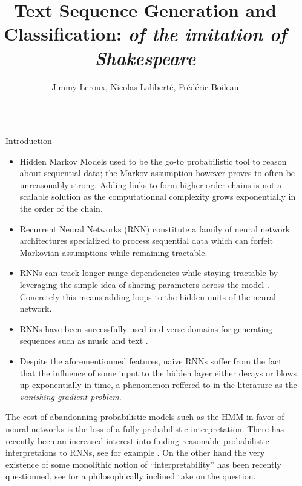 \documentclass[final]{beamer}
\title{Text Sequence Generation and Classification: \textit{of the imitation of
Shakespeare}}
\author{Jimmy Leroux, Nicolas Laliberté, Frédéric Boileau}
\institute[]{Départment d'Informatique et de Recherche Opérationnelle -
Université de Montréal}
\newlength{\sepwidth}
\newlength{\colwidth}
\newcommand{\separatorcolumn}{\begin{column}{\sepwidth}\end{column}}
\begin{document}
\begin{frame}[t]
\begin{columns}[t]
\separatorcolumn

\begin{column}{\colwidth}

\begin{block}{Introduction}
\begin{itemize}
\item Hidden Markov Models used to be the go-to probabilistic tool to reason
    about sequential data; the Markov assumption however proves to often be
    unreasonably strong. Adding links to form higher order chains is not a
    scalable solution as the computationnal complexity grows exponentially in
    the order of the chain.

\item Recurrent Neural Networks (RNN) constitute a family of neural network
architectures specialized to process sequential data which can forfeit
Markovian assumptions while remaining tractable.

\item RNNs can track longer range dependencies while
    staying tractable by leveraging the simple idea of sharing parameters
    across the model \cite{deeplearning}. Concretely this means adding loops to
    the hidden units of the neural network.

\item RNNs have been successfully used in diverse domains for
  generating sequences such as music and text \cite{gravesGenerating}. 

\item Despite the aforementionned features, naive RNNs suffer from the fact 
that the influence of some input to the hidden layer either decays or blows up
exponentially in time, a phenomenon reffered to in the literature as the
\textit{vanishing gradient problem}.
\end{itemize}
The cost of abandonning probabilistic models such as the HMM in favor of neural
networks is the loss of a fully probabilistic interpretation. There has
recently been an increased interest into finding reasonable probabilistic
interpretaions to RNNs, see for example \cite{finnish}. On the other hand the
very existence of some monolithic notion of ``interpretability'' has been
recently questionned, see \cite{mythos} for a philosophically inclined take
on the question.
\end{block}


\end{column}
\end{columns}
\end{frame}
\end{document}
